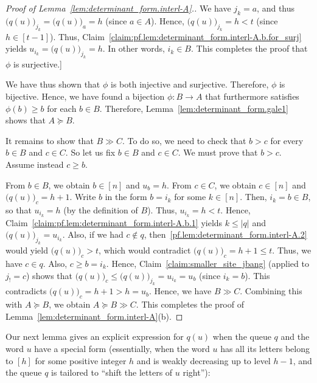 \documentclass[reqno]{amsart}
\newcommand{\0}{\phantom{c}}
\newcommand{\abs}[1]{\left| #1 \right|}
\newcommand{\ive}[1]{\left[ #1 \right]}
\theoremstyle{plain}
\theoremstyle{definition}
\numberwithin{equation}{section}
\begin{document}
\begin{proof}[Proof of Lemma~\ref{lem:determinant_form.interl-A}.]
We have $j_k = a$, and thus $\bigl( q(u) \bigr)_{j_k} = \bigl( q(u) \bigr)_a = h$ (since $a \in A$).
Hence, $\bigl( q(u) \bigr)_{j_k} = h < t$ (since $h \in \ive{t-1}$).
Thus, Claim~\ref{claim:pf.lem:determinant_form.interl-A.b.for_surj} yields
$u_{i_k} = \bigl( q(u) \bigr)_{j_k} = h$.
In other words, $i_k \in B$.
This completes the proof that $\phi$ is surjective.]

We have thus shown that $\phi$ is both injective and surjective. Therefore, $\phi$ is bijective.
Hence, we have found a bijection $\phi \colon B \to A$ that
furthermore satisfies $\phi(b) \geq b$ for each $b\in B$.
Therefore, Lemma~\ref{lem:determinant_form.gale1} shows that $A \succeq B$.

It remains to show that $B \gg C$.
To do so, we need to check that $b > c$ for every $b \in B$ and $c \in C$.
So let us fix $b \in B$ and $c \in C$.
We must prove that $b > c$. Assume instead $c \geq b$.

From $b\in B$, we obtain $b \in \ive{n}$ and $u_{b} = h$.
From $c\in C$, we obtain $c\in \ive{n}$ and $\bigl( q(u) \bigr)_{c} = h+1$.
Write $b$ in the form $b=i_k$ for some $k\in \ive{n}$.
Then, $i_k=b\in B$, so that $u_{i_k} = h$ (by the definition of $B$).
Thus, $u_{i_k} = h < t$.
Hence, Claim~\ref{claim:pf.lem:determinant_form.interl-A.b.1} yields $k \leq \abs{q}$ and $\bigl( q(u) \bigr)_{j_k} = u_{i_k}$.
Also, if we had $c\notin q$, then~\eqref{pf.lem:determinant_form.interl-A.2} would yield $\bigl( q(u) \bigr)_{c} > t$, which would contradict $\bigl( q(u) \bigr)_c = h + 1 \leq t$.
Thus, we have $c\in q$.
Also, $c \geq b = i_k$.
Hence, Claim~\ref{claim:smaller_site_jbang} (applied to $j_{!} = c$) shows that $\bigl( q(u) \bigr)_c \leq \bigl( q(u) \bigr)_{j_k} = u_{i_k} = u_{b}$ (since $i_k = b$).
This contradicts $\bigl( q(u) \bigr)_c = h + 1 > h = u_{b}$.
Hence, we have $B\gg C$.
Combining this with $A\succeq B$, we obtain $A \succeq B \gg C$.
This completes the proof of Lemma~\ref{lem:determinant_form.interl-A}(b).
\end{proof}

Our next lemma gives an explicit expression for $q(u)$ when the queue $q$ and the word $u$ have a special form (essentially, when the word $u$ has all its letters belong to $\ive{h}$ for some positive integer $h$ and is weakly decreasing up to level $h-1$, and the queue $q$ is tailored to ``shift the letters of $u$ right''):
\end{document}
